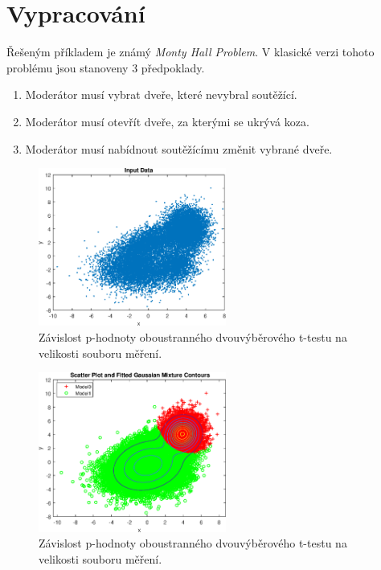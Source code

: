 \section{Vypracování}

Řešeným příkladem je známý \textit{Monty Hall Problem}.
V klasické verzi tohoto problému jsou stanoveny 3 předpoklady.

\begin{enumerate}
    \item Moderátor musí vybrat dveře, které nevybral soutěžící.
    \item Moderátor musí otevřít dveře, za kterými se ukrývá koza.
    \item Moderátor musí nabídnout soutěžícímu změnit vybrané dveře.
\end{enumerate}

\begin{figure}[htb]
    \centering
    \includegraphics[width=0.55\textwidth]{graphs/fig1.eps}
    \caption{Závislost p-hodnoty oboustranného dvouvýběrového t-testu na velikosti souboru měření.}
    \label{fig:result1}
\end{figure}
\FloatBarrier

\begin{figure}[htb]
    \centering
    \includegraphics[width=0.55\textwidth]{graphs/fig2.eps}
    \caption{Závislost p-hodnoty oboustranného dvouvýběrového t-testu na velikosti souboru měření.}
    \label{fig:result2}
\end{figure}
\FloatBarrier

